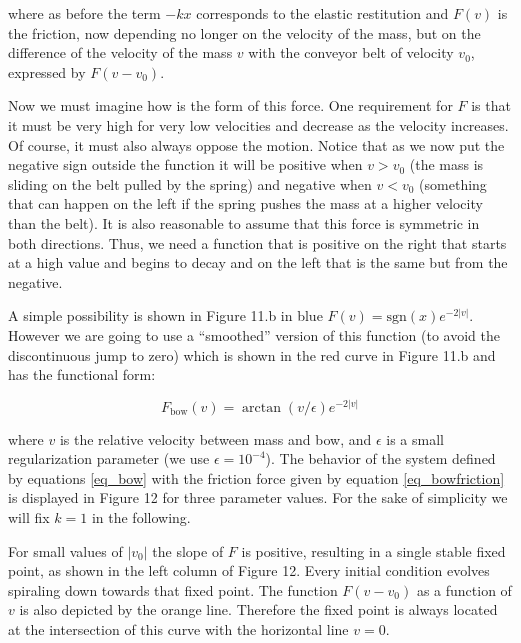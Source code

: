 \documentclass{article}
\begin{document}
where as before the term $-kx$ corresponds to the elastic restitution and $F(v)$ is the friction, now depending no longer on the velocity of the mass, but on the difference of the velocity of the mass $v$ with the conveyor belt of velocity $v_0$, expressed by $F(v - v_0)$.

Now we must imagine how is the form of this force. 
One requirement for $F$ is that it must be very high for very low velocities and decrease as the velocity increases. 
Of course, it must also always oppose the motion. 
Notice that as we now put the negative sign outside the function it will be positive when $v>v_0$ (the mass is sliding on the belt pulled by the spring) and negative when $v<v_0$ (something that can happen on the left if the spring pushes the mass at a higher velocity than the belt). 
It is also reasonable to assume that this force is symmetric in both directions. 
Thus, we need a function that is positive on the right that starts at a high value and begins to decay and on the left that is the same but from the negative. 

A simple possibility is shown in Figure 11.b in blue $F(v) = \text{sgn}(x) e^{-2|v|}$. 
However we are going to use a “smoothed” version of this function (to avoid the discontinuous jump to zero) which is shown in the red curve in Figure 11.b and has the functional form:

\begin{equation} \label{eq_bowfriction}
    F_{\text{bow}}(v) = \arctan(v/\epsilon) e^{-2|v|} 
\end{equation}

where $v$ is the relative velocity between mass and bow, and $\epsilon$ is a small regularization parameter (we use $\epsilon = 10^{-4}$).
The behavior of the system defined by equations \ref{eq_bow} with the friction force given by equation \ref{eq_bowfriction} is displayed in Figure 12 for three parameter values. 
For the sake of simplicity we will fix $k=1$ in the following.

For small values of $|v_0|$ the slope of $F$ is positive, resulting in a single stable fixed point, as shown in the left column of Figure 12.
Every initial condition evolves spiraling down towards that fixed point. 
The function $F(v-v_0)$ as a function of $v$ is also depicted by the 
orange line. Therefore the fixed point is always located at the intersection of this curve with the horizontal line $v=0$.
\end{document}
